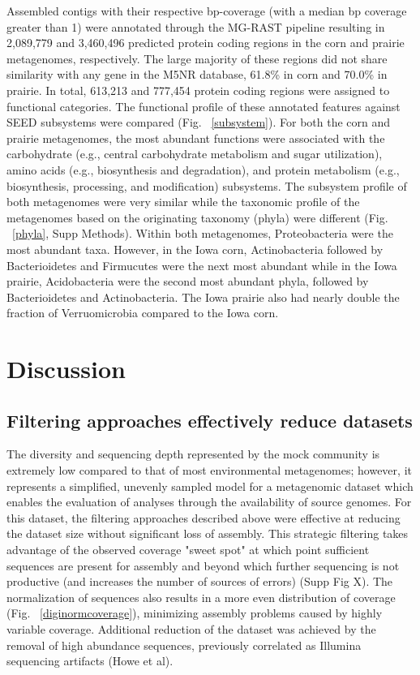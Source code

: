 \documentclass[11pt]{article} %
\begin{document}
Assembled contigs with their respective bp-coverage (with a median bp coverage greater than 1) were annotated through the MG-RAST pipeline resulting in 2,089,779 and  3,460,496 predicted protein coding regions in the corn and prairie metagenomes, respectively.  The large majority of these regions did not share similarity with any gene in the M5NR database, 61.8\% in corn and 70.0\% in prairie.  In total, 613,213 and 777,454 protein coding regions were assigned to functional categories.  The functional profile of these annotated features against SEED subsystems were compared (Fig. ~\ref{subsystem}).  For both the corn and prairie metagenomes, the most abundant functions were associated with the carbohydrate (e.g., central carbohydrate metabolism and sugar utilization), amino acids (e.g., biosynthesis and degradation), and protein metabolism (e.g., biosynthesis, processing, and modification) subsystems.  The subsystem profile of both metagenomes were very similar while the taxonomic profile of the metagenomes based on the originating taxonomy (phyla) were different (Fig. ~\ref{phyla}, Supp Methods).  Within both metagenomes, Proteobacteria were the most abundant taxa.  However, in the Iowa corn, Actinobacteria followed by Bacterioidetes and Firmucutes were the next most abundant while in the Iowa prairie, Acidobacteria were the second most abundant phyla, followed by Bacterioidetes  and Actinobacteria.  The Iowa prairie also had nearly double the fraction of Verruomicrobia compared to the Iowa corn.  


\section{Discussion}

\subsection{Filtering approaches effectively reduce datasets} 

The diversity and sequencing depth represented by the mock community is extremely low compared to that of most environmental metagenomes; however, it represents a simplified, unevenly sampled model for a metagenomic dataset which enables the evaluation of analyses through the availability of source genomes.  For this dataset, the filtering approaches described above were effective at reducing the dataset size without significant loss of assembly.  This strategic filtering takes advantage of the observed coverage "sweet spot" at which point sufficient sequences are present for assembly and beyond which further sequencing is not productive (and increases the number of sources of errors) (Supp Fig X).    The normalization of sequences also results in a more even distribution of coverage (Fig. ~\ref{diginormcoverage}), minimizing assembly problems caused by highly variable coverage.  Additional reduction of the dataset was achieved by the removal of high abundance sequences, previously correlated as Illumina sequencing artifacts (Howe et al).  
\end{document}
